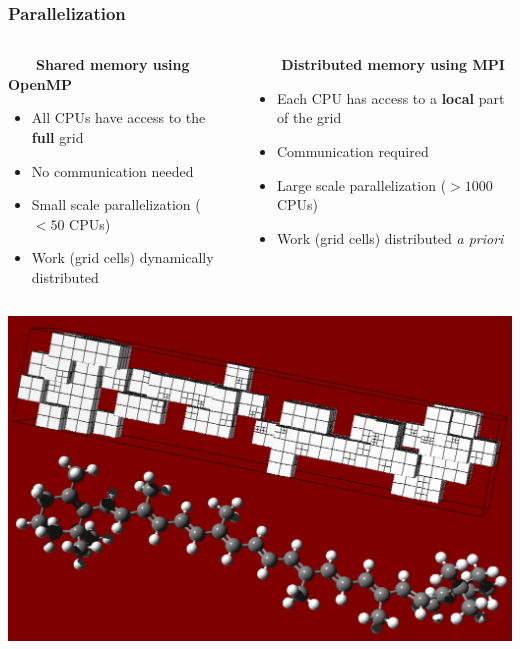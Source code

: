 \begin{frame}
    \frametitle{Parallelization}
    \tiny
    \begin{columns}
    \begin{column}{.5\textwidth}
	\ \ \ \ \textbf{Shared memory using OpenMP}
	\begin{itemize}
	    \item All CPUs have access to the \textbf{full} grid
	    \item No communication needed
	    \item Small scale parallelization ($<50$ CPUs)
	    \item Work (grid cells) dynamically distributed
	\end{itemize}
    \end{column}
    \begin{column}{.5\textwidth}
	\ \ \ \ \textbf{Distributed memory using MPI}
	\begin{itemize}
	    \item Each CPU has access to a \textbf{local} part of the grid
	    \item Communication required
	    \item Large scale parallelization ($>1000$ CPUs)
	    \item Work (grid cells) distributed \it{a priori}
	\end{itemize}
    \end{column}
    \end{columns}

    \vspace{10mm}

    \centering
    \includegraphics[angle=0, scale=0.2]{figures/caroteneGrid.pdf}
\end{frame}

